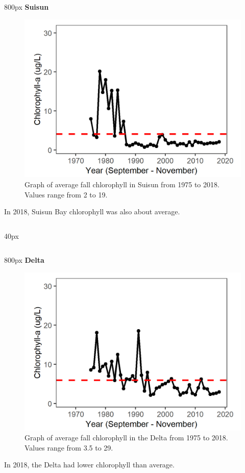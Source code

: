 \documentclass[
]{book}
\begin{document}
\begin{column}{800px\textwidth}
\textbf{Suisun}

\begin{figure}
\includegraphics[width=15.25in]{figures/chla_ssfall} \caption{Graph of average fall chlorophyll in Suisun from 1975 to 2018. Values range from 2 to 19.}\label{fig:unnamed-chunk-109}
\end{figure}

In 2018, Suisun Bay chlorophyll was also about average.
\end{column}

\begin{column}{40px\textwidth}
~
\end{column}

\begin{column}{800px\textwidth}
\textbf{Delta}

\begin{figure}
\includegraphics[width=15.25in]{figures/chla_dtfall} \caption{Graph of average fall chlorophyll in the Delta from 1975 to 2018. Values range from 3.5 to 29.}\label{fig:unnamed-chunk-110}
\end{figure}

In 2018, the Delta had lower chlorophyll than average.
\end{column}
\end{document}
